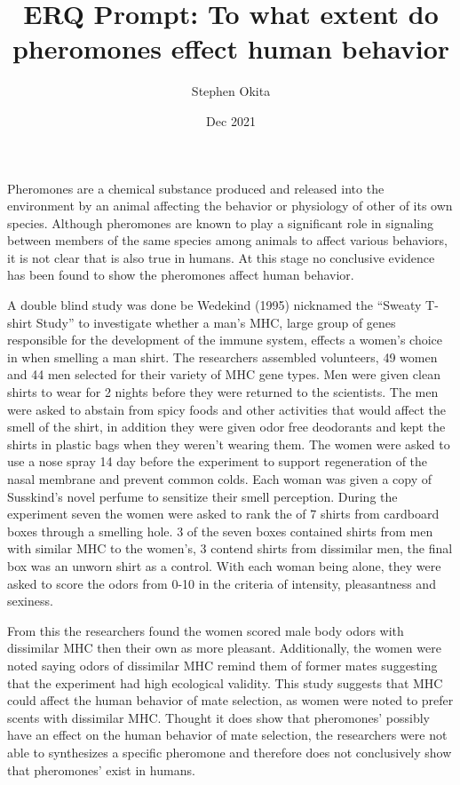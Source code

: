 \documentclass{article}
\begin{document}
\title{ERQ Prompt: To what extent do pheromones effect human behavior}
\author{Stephen Okita}
\date{Dec 2021}
\maketitle
Pheromones are a chemical substance produced and released into the environment by an animal affecting the behavior or physiology of other of its own species.  Although pheromones are known to play a significant role in signaling between members of the same species among animals to affect various behaviors, it is not clear that is also true in humans. At this stage no conclusive evidence has been found to show the pheromones affect human behavior.

A double blind study was done be Wedekind (1995)  nicknamed the “Sweaty T-shirt Study”  to investigate whether a man's MHC,  large group of genes responsible for the development of the immune system, effects a women's choice in when smelling a man shirt.  The researchers assembled volunteers, 49 women and 44 men selected for their variety of MHC gene types. Men were given clean shirts to wear for 2 nights before they were returned to the scientists. The men were asked to abstain from spicy foods and other activities that would affect the smell of the shirt, in addition they were given odor free deodorants and kept the shirts in plastic bags when they weren't wearing them. The women were asked to use a nose spray 14 day before the experiment to support regeneration of the nasal membrane and prevent common colds. Each woman was given a copy of Susskind's novel perfume to sensitize their smell perception. During the experiment seven the women were asked to rank the of 7 shirts from cardboard boxes through a smelling hole. 3 of the seven boxes contained shirts from men with similar MHC to the women's, 3 contend shirts from dissimilar men, the final box was an unworn shirt as a control. With each woman being alone, they were asked to score the odors from 0-10 in the criteria of intensity, pleasantness and sexiness. 

From this the researchers found the women scored male body odors with dissimilar MHC then their own as more pleasant. Additionally, the women were noted saying odors of dissimilar MHC remind them of former mates suggesting that the experiment had high ecological validity.  This study suggests that MHC could affect the human behavior of mate selection, as women were noted to prefer scents with dissimilar MHC. Thought it does show that pheromones' possibly have an effect on the human behavior of mate selection, the researchers were not able to synthesizes a specific pheromone and therefore does not conclusively show that pheromones' exist in humans. 
\end{document}
